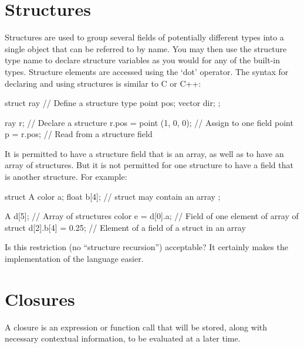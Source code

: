 \documentclass[11pt,letterpaper]{book}
\def\closure{{\cf closure}\xspace}
\begin{document}
\section{Structures}
\label{sec:types:struct}
  

Structures are used to group several fields of potentially different
types into a single object that can be referred to by name.  You may
then use the structure type name to declare structure variables as you
would for any of the built-in types.  Structure elements are accessed
using the `dot' operator.  The syntax for declaring and using structures
is similar to C or C++:

\begin{code}
    struct ray {                   // Define a structure type
        point pos;
        vector dir;
    };

    ray r;                         // Declare a structure
    r.pos = point (1, 0, 0);       // Assign to one field
    point p = r.pos;               // Read from a structure field
\end{code}

It is permitted to have a structure field that is an array, as well as
to have an array of structures.  But it is not permitted for one
structure to have a field that is another structure.  For example:

\begin{code}
    struct A {
        color a;
        float b[4];       // struct may contain an array
    };

    A d[5];               // Array of structures
    color e = d[0].a;     // Field of one element of array of struct
    d[2].b[4] = 0.25;     // Element of a field of a struct in an array
\end{code}

\begin{annotate}
\QUESTION Is this restriction (no ``structure recursion'') acceptable?
It certainly makes the implementation of the language easier.
\end{annotate}



\section{Closures}
\label{sec:types:closures}

A \closure is an expression or function call that will be stored, along
with necessary contextual information, to be evaluated at a later time.
\end{document}
